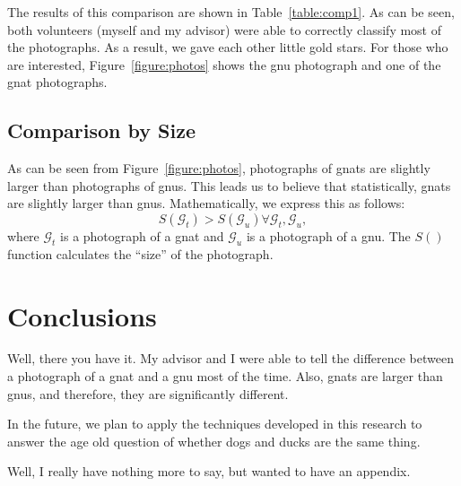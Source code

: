 \documentclass[12pt]{thesis}
\begin{document}
The results of this comparison are shown in Table~\ref{table:comp1}.
As can be seen, both volunteers (myself and my advisor) were able to
correctly classify most of the photographs.  As a result, we gave each
other little gold stars.
For those who are interested, Figure~\ref{figure:photos} shows the gnu
photograph and one of the gnat photographs.

\section{Comparison by Size}
 As can be seen from
Figure~\ref{figure:photos}, photographs of gnats are slightly larger
than photographs of gnus.  This leads us to believe that
statistically, gnats are slightly larger than gnus.  Mathematically,
we express this as follows:
\begin{equation}
S(\mathcal{G}_t) > S(\mathcal{G}_u) \forall
\mathcal{G}_t,\mathcal{G}_u,
\end{equation}
where $\mathcal{G}_t$ is a photograph of a gnat and $\mathcal{G}_u$ is
a photograph of a gnu.  The $S()$ function calculates the ``size'' of
the photograph.

\chapter{Conclusions}

Well, there you have it.  My advisor and I were able to tell the
difference between a photograph of a gnat and a gnu most of the time.
Also, gnats are larger than gnus, and therefore, they are
significantly different.

In the future, we plan to apply the techniques developed in this
research to answer the age old question of whether dogs and ducks are
the same thing.

\supplementaries





\begin{appendices}

 Well, I really have nothing more to say,
but wanted to have an appendix.

\end{appendices}

\end{document}
